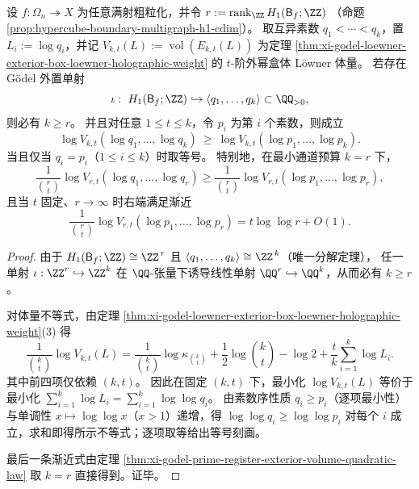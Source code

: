 \begin{corollary}\label{cor:conclusion-boundary-cycle-rank-loewner-prime-lower-bound}
设 \(f:\Omega_n\twoheadrightarrow X\) 为任意满射粗粒化，并令
\(
r:=\operatorname{rank}_{\ZZ}H_1(\mathsf B_f;\ZZ)
\)
（命题 \ref{prop:hypercube-boundary-multigraph-h1-cdim}）。
取互异素数 \(q_1<\cdots<q_k\)，置 \(L_i:=\log q_i\)，并记
\(
V_{k,t}(L):=\operatorname{vol}(E_{k,t}(L))
\)
为定理 \ref{thm:xi-godel-loewner-exterior-box-loewner-holographic-weight} 的 \(t\)-阶外幂盒体 Löwner 体量。
若存在 Gödel 外置单射
\[
\iota:\ H_1(\mathsf B_f;\ZZ)\hookrightarrow \langle q_1,\dots,q_k\rangle\subset \QQ_{>0},
\]
则必有 \(k\ge r\)。
并且对任意 \(1\le t\le k\)，令 \(p_i\) 为第 \(i\) 个素数，则成立
\[
\boxed{\;
\log V_{k,t}(\log q_1,\dots,\log q_k)\ \ge\ \log V_{k,t}(\log p_1,\dots,\log p_k).\;}
\]
当且仅当 \(q_i=p_i\)（\(1\le i\le k\)）时取等号。
特别地，在最小通道预算 \(k=r\) 下，
\[
\frac{1}{\binom{r}{t}}\log V_{r,t}(\log q_1,\dots,\log q_r)
\ge
\frac{1}{\binom{r}{t}}\log V_{r,t}(\log p_1,\dots,\log p_r),
\]
且当 \(t\) 固定、\(r\to\infty\) 时右端满足渐近
\[
\frac{1}{\binom{r}{t}}\log V_{r,t}(\log p_1,\dots,\log p_r)
=t\log\log r+O(1).
\]
\end{corollary}
\begin{proof}
由于 \(H_1(\mathsf B_f;\ZZ)\cong \ZZ^{\,r}\) 且 \(\langle q_1,\dots,q_k\rangle\cong \ZZ^{\,k}\)（唯一分解定理），
任一单射 \(\iota:\ZZ^{r}\hookrightarrow \ZZ^{k}\) 在 \(\QQ\)-张量下诱导线性单射 \(\QQ^{r}\hookrightarrow \QQ^{k}\)，从而必有 \(k\ge r\)。
\par
对体量不等式，由定理 \ref{thm:xi-godel-loewner-exterior-box-loewner-holographic-weight}(3) 得
\[
\frac{1}{\binom{k}{t}}\log V_{k,t}(L)
=\frac{1}{\binom{k}{t}}\log\kappa_{\binom{k}{t}}+\frac12\log\binom{k}{t}-\log 2+\frac{t}{k}\sum_{i=1}^{k}\log L_i.
\]
其中前四项仅依赖 \((k,t)\)。
因此在固定 \((k,t)\) 下，最小化 \(\log V_{k,t}(L)\) 等价于最小化 \(\sum_{i=1}^{k}\log L_i=\sum_{i=1}^{k}\log\log q_i\)。
由素数序性质 \(q_i\ge p_i\)（逐项最小性）与单调性 \(x\mapsto \log\log x\)（\(x>1\)）递增，得
\(
\log\log q_i\ge \log\log p_i
\)
对每个 \(i\) 成立，求和即得所示不等式；逐项取等给出等号刻画。
\par
最后一条渐近式由定理 \ref{thm:xi-godel-prime-register-exterior-volume-quadratic-law} 取 \(k=r\) 直接得到。证毕。
\end{proof}


